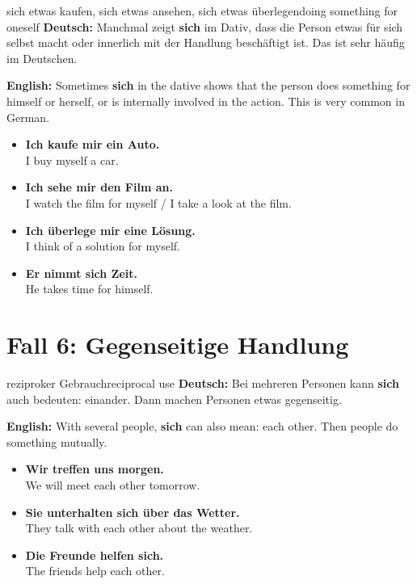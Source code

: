 \documentclass[a4paper,11pt]{article}
\newcommand{\GermanText}[1]{\textbf{Deutsch: }#1\par}
\newcommand{\EnglishText}[1]{{\small\color{SoftGray}\textbf{English: }#1\par}}
\newcommand{\ExampleItem}[2]{\item \textbf{#1}\\{\small\color{SoftGray}#2}}
\begin{document}
        \begin{grammarentry}{sich etwas kaufen, sich etwas ansehen, sich etwas überlegen}{doing something for oneself}
            \GermanText{Manchmal zeigt \textbf{sich} im Dativ, dass die Person etwas für sich selbst macht oder innerlich mit der Handlung beschäftigt ist. Das ist sehr häufig im Deutschen.}
            \EnglishText{Sometimes \textbf{sich} in the dative shows that the person does something for himself or herself, or is internally involved in the action. This is very common in German.}
            
            \begin{exbox}
                \begin{itemize}
                    \ExampleItem{Ich kaufe mir ein Auto.}{I buy myself a car.}
                    \ExampleItem{Ich sehe mir den Film an.}{I watch the film for myself / I take a look at the film.}
                    \ExampleItem{Ich überlege mir eine Lösung.}{I think of a solution for myself.}
                    \ExampleItem{Er nimmt sich Zeit.}{He takes time for himself.}
                \end{itemize}
            \end{exbox}
        \end{grammarentry}
    
    
    \section{Fall 6: Gegenseitige Handlung}
        
        \begin{grammarentry}{reziproker Gebrauch}{reciprocal use}
            \GermanText{Bei mehreren Personen kann \textbf{sich} auch bedeuten: einander. Dann machen Personen etwas gegenseitig.}
            \EnglishText{With several people, \textbf{sich} can also mean: each other. Then people do something mutually.}
            
            \begin{exbox}
                \begin{itemize}
                    \ExampleItem{Wir treffen uns morgen.}{We will meet each other tomorrow.}
                    \ExampleItem{Sie unterhalten sich über das Wetter.}{They talk with each other about the weather.}
                    \ExampleItem{Die Freunde helfen sich.}{The friends help each other.}
                \end{itemize}
            \end{exbox}
        \end{grammarentry}
    
\end{document}
